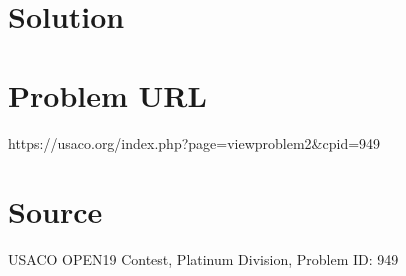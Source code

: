 \documentclass[12pt]{article}
\begin{document}
\section*{Solution}


\section*{Problem URL}
https://usaco.org/index.php?page=viewproblem2&cpid=949

\section*{Source}
USACO OPEN19 Contest, Platinum Division, Problem ID: 949
\end{document}
